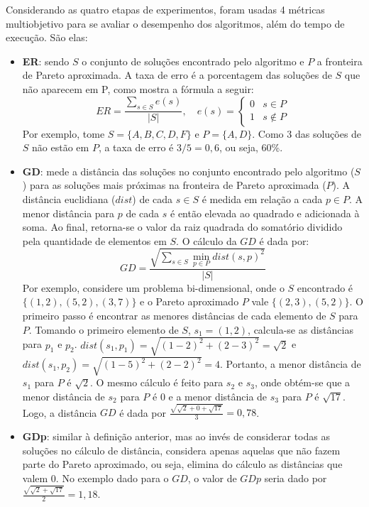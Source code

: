 Considerando as quatro etapas de experimentos, foram usadas 4 métricas multiobjetivo para se avaliar o desempenho dos algoritmos, além do tempo de execução. São elas:

\begin{itemize}
	\item \textbf{\ac{ER}}: sendo $S$ o conjunto de soluções encontrado pelo algoritmo e $P$ a fronteira de Pareto aproximada. A taxa de erro é a porcentagem das soluções de $S$ que não aparecem em P, como mostra a fórmula a seguir:
	\begin{equation}
		ER = \frac{\sum\limits_{s \in S} e(s)}{|S|}, \quad
		e(s) = 
		\begin{cases} 
			0 & s \in P \\
			1 & s \notin P
		\end{cases}
	\end{equation}
	Por exemplo, tome $S=\{A, B, C, D, F\}$ e $P=\{A,D\}$. Como 3 das soluções de $S$ não estão em $P$, a taxa de erro é $3/5=0,6$, ou seja, 60\%.
	\item \textbf{\ac{GD}}: mede a distância das soluções no conjunto encontrado pelo algoritmo ($S$) para as soluções mais próximas na fronteira de Pareto aproximada ($P$). A distância euclidiana ($dist$) de cada $s \in S$ é medida em relação a cada $p \in P$. A menor distância para $p$ de cada $s$ é então elevada ao quadrado e adicionada à soma. Ao final, retorna-se o valor da raiz quadrada do somatório dividido pela quantidade de elementos em $S$. O cálculo da $GD$ é dada por:
	\begin{equation}GD = \frac{\sqrt{\sum\limits_{s \in S} \min\limits_{p \in P} dist(s, p)^2}}{|S|}\end{equation}
	Por exemplo, considere um problema bi-dimensional, onde o $S$ encontrado é $\{(1,2), (5,2), (3,7)\}$ e o Pareto aproximado $P$ vale $\{(2,3), (5,2)\}$. O primeiro passo é encontrar as menores distâncias de cada elemento de $S$ para $P$. Tomando o primeiro elemento de $S$, $s_1=(1,2)$, calcula-se as distâncias para $p_1$ e $p_2$. $dist(s_1, p_1)=\sqrt{(1-2)^2 + (2-3)^2}=\sqrt{2}$ e $dist(s_1, p_2)=\sqrt{(1-5)^2 + (2-2)^2}=4$. Portanto, a menor distância de $s_1$ para $P$ é $\sqrt{2}$. O mesmo cálculo é feito para $s_2$ e $s_3$, onde obtém-se que a menor distância de $s_2$ para $P$ é 0 e a menor distância de $s_3$ para $P$ é $\sqrt{17}$. Logo, a distância $GD$ é dada por $\frac{\sqrt{\sqrt{2} + 0 + \sqrt{17}}}{3}=0,78$.
	\item \textbf{\ac{GDp}}: similar à definição anterior, mas ao invés de considerar todas as soluções no cálculo de distância, considera apenas aquelas que não fazem parte do Pareto aproximado, ou seja, elimina do cálculo as distâncias que valem 0. No exemplo dado para o $GD$, o valor de $GDp$ seria dado por $\frac{\sqrt{\sqrt{2} + \sqrt{17}}}{2}=1,18$.

\end{itemize}
